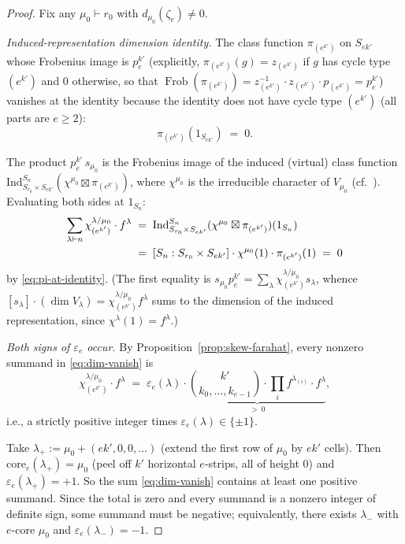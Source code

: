 \documentclass[11pt]{article}
\theoremstyle{definition}
\theoremstyle{remark}
\DeclareMathOperator{\Frob}{Frob}
\newcommand{\zetae}{\zeta_e}
\newcommand{\core}{\mathrm{core}}
\begin{document}
\begin{proof}
Fix any $\mu_0\vdash r_0$ with $d_{\mu_0}(\zetae)\ne 0$.

\smallskip\emph{Induced-representation dimension identity.}
The class function $\pi_{(e^{k'})}$ on $S_{ek'}$ whose Frobenius image is
$p_e^{k'}$ (explicitly, $\pi_{(e^{k'})}(g) = z_{(e^{k'})}$ if $g$ has cycle
type $(e^{k'})$ and $0$ otherwise, so that
$\Frob(\pi_{(e^{k'})}) = z_{(e^{k'})}^{-1}\cdot z_{(e^{k'})}\cdot p_{(e^{k'})} = p_e^{k'}$)
vanishes at the identity because the identity does not have cycle type
$(e^{k'})$ (all parts are $e\ge 2$):
\begin{equation}
\label{eq:pi-at-identity}
  \pi_{(e^{k'})}(1_{S_{ek'}}) \;=\; 0.
\end{equation}

The product $p_e^{k'}\,s_{\mu_0}$ is the Frobenius image of the
induced (virtual) class function
$\mathrm{Ind}_{S_{r_0}\times S_{ek'}}^{S_n}(\chi^{\mu_0}\boxtimes\pi_{(e^{k'})})$,
where $\chi^{\mu_0}$ is the irreducible character of $V_{\mu_0}$
(cf.~\cite[Prop.~7.18.7]{Sta99}). Evaluating both sides at $1_{S_n}$:
\begin{align}
\label{eq:dim-vanish}
  \sum_{\lambda\vdash n} \chi^{\lambda/\mu_0}_{(e^{k'})}\cdot f^\lambda
  &\;=\; \mathrm{Ind}_{S_{r_0}\times S_{ek'}}^{S_n}(\chi^{\mu_0}\boxtimes\pi_{(e^{k'})})(1_{S_n})\notag\\
  &\;=\; [S_n : S_{r_0}\times S_{ek'}]\cdot\chi^{\mu_0}(1)\cdot\pi_{(e^{k'})}(1)
  \;=\; 0
\end{align}
by \eqref{eq:pi-at-identity}. (The first equality is
$s_{\mu_0}p_e^{k'} = \sum_\lambda\chi^{\lambda/\mu_0}_{(e^{k'})}s_\lambda$,
whence $[s_\lambda]\cdot(\dim V_\lambda) = \chi^{\lambda/\mu_0}_{(e^{k'})}f^\lambda$
sums to the dimension of the induced representation, since
$\chi^\lambda(1) = f^\lambda$.)

\smallskip\emph{Both signs of $\varepsilon_e$ occur.}
By Proposition~\ref{prop:skew-farahat}, every nonzero summand in
\eqref{eq:dim-vanish} is
\[
  \chi^{\lambda/\mu_0}_{(e^{k'})}\cdot f^\lambda
  \;=\; \varepsilon_e(\lambda)\cdot\underbrace{\binom{k'}{k_0,\ldots,k_{e-1}}\cdot
  \prod_i f^{\lambda_{(i)}}\cdot f^\lambda}_{>\,0},
\]
i.e., a strictly positive integer times $\varepsilon_e(\lambda)\in\{\pm 1\}$.

Take $\lambda_+:=\mu_0+(ek',0,0,\ldots)$ (extend the first row of $\mu_0$ by
$ek'$ cells). Then $\core_e(\lambda_+)=\mu_0$ (peel off $k'$ horizontal
$e$-strips, all of height $0$) and $\varepsilon_e(\lambda_+)=+1$. So the sum
\eqref{eq:dim-vanish} contains at least one positive summand. Since the
total is zero and every summand is a nonzero integer of definite sign, some
summand must be negative; equivalently, there exists $\lambda_-$ with
$e$-core $\mu_0$ and $\varepsilon_e(\lambda_-)=-1$.


\end{proof}
\end{document}
